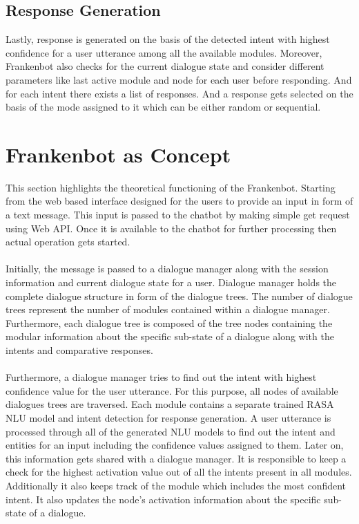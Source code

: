 \subsection{Response Generation}
Lastly, response is generated on the basis of the detected intent with highest confidence for a user utterance among all the available modules. Moreover, Frankenbot also checks for the current dialogue state and consider different parameters like last active module and node for each user before responding. And for each intent there exists a list of responses. And a response gets selected on the basis of the mode assigned to it which can be either random or sequential.  

\section{Frankenbot as Concept}
This section highlights the theoretical functioning of the Frankenbot. Starting from the web based interface designed for the users to provide an input in form of a text message. This input is passed to the chatbot by making simple get request using Web API. Once it is available to the chatbot for further processing then actual operation gets started.
\\~\\
Initially, the message is passed to a dialogue manager along with the session information and current dialogue state for a user. Dialogue manager holds the complete dialogue structure in form of the dialogue trees. The number of dialogue trees represent the number of modules contained within a dialogue manager. Furthermore, each dialogue tree is composed of the tree nodes containing the modular information about the specific sub-state of a dialogue along with the intents and comparative responses.
\\~\\
Furthermore, a dialogue manager tries to find out the intent with highest confidence value for the user utterance. For this purpose, all nodes of available dialogues trees are traversed. Each module contains a separate trained RASA NLU model and intent detection for response generation. A user utterance is processed through all of the generated NLU models to find out the intent and entities for an input including the confidence values assigned to them. Later on, this information gets shared with a dialogue manager. It is responsible to keep a check for the highest activation value out of all the intents present in all modules. Additionally it also keeps track of the module which includes the most confident intent. It also updates the node's activation information about the specific sub-state of a dialogue.
